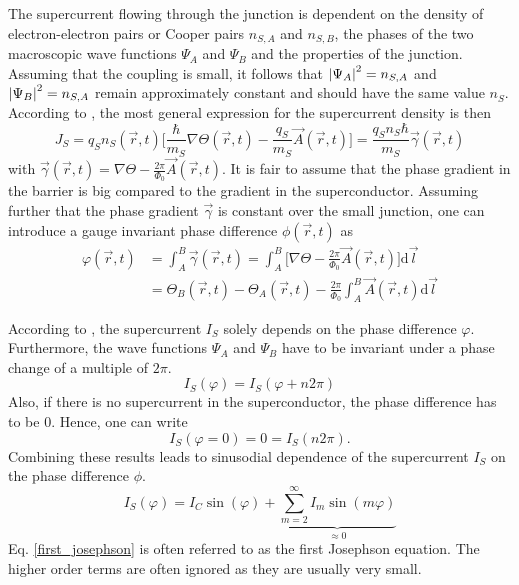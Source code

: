 \documentclass[a4paper,10pt]{article}
\newcommand{\dif}{\mathrm{d}}
\begin{document}
The supercurrent flowing through the junction is dependent on the density of electron-electron pairs or Cooper pairs $n_{S,A}$ and $n_{S,B}$, the phases of the two macroscopic wave functions $\Psi_A$ and $\Psi_B$ and the properties of the junction. Assuming that the coupling is small, it follows that $\abs{\Psi_A}^2 = n_{S,A}$ and $\abs{\Psi_B}^2 = n_{S,A}$ remain approximately constant and should have the same value $n_{S}$. 
According to \cite{grossmarx}, the most general expression for the supercurrent density is then 
\begin{equation}
    J_S = q_S n_S(\vec{r},t) \big[ \frac{\hbar}{m_S} \nabla \Theta(\vec{r},t) - \frac{q_S}{m_S} \vec{A}(\vec{r},t) \big] = \frac{q_S n_S \hbar}{m_S} \vec{\gamma}(\vec{r},t)
\end{equation}
with $\vec{\gamma}(\vec{r},t) = \nabla \Theta - \frac{2 \pi}{\Phi_0} \vec{A}(\vec{r},t)$. It is fair to assume that the phase gradient in the barrier is big compared to the gradient in the superconductor. Assuming further that the phase gradient $\vec{\gamma}$ is constant over the small junction, one can introduce a gauge invariant phase difference $\phi(\vec{r}, t)$ as 
\begin{equation}
    \begin{split}
        \label{eq_phase}
        \varphi(\vec{r}, t) &= \int^B_A \vec{\gamma}(\vec{r},t) = \int^B_A \big[ \nabla \Theta - \frac{2 \pi}{\Phi_0} \vec{A}(\vec{r},t) \big] \dif \vec{l} \\
        &= \Theta_B(\vec{r}, t) - \Theta_A(\vec{r}, t) - \frac{2 \pi}{\Phi_0} \int^B_A \vec{A}(\vec{r},t) \dif \vec{l}
    \end{split}
\end{equation}

According to \cite{skriptum}, the supercurrent $I_S$ solely depends on the phase difference $\varphi$. Furthermore, the wave functions $\Psi_A$ and $\Psi_B$ have to be invariant under a phase change of a multiple of $2 \pi$. 
\begin{equation}
    I_S(\varphi) = I_S(\varphi + n 2 \pi)
\end{equation}
Also, if there is no supercurrent in the superconductor, the phase difference has to be $0$. Hence, one can write 
\begin{equation}
    I_S(\varphi = 0) = 0 = I_S( n 2 \pi).
\end{equation}
Combining these results leads to sinusodial dependence of the supercurrent $I_S$ on the phase difference $\phi$.
\begin{equation}
    I_S(\varphi) = I_C \sin(\varphi) + \underbrace{\sum^{\infty}_{m = 2} I_m \sin(m \varphi)}_{\approx 0}
    \label{first_josephson}
\end{equation}
Eq. \ref{first_josephson} is often referred to as the first Josephson equation. The higher order terms are often ignored as they are usually very small. 
\end{document}
